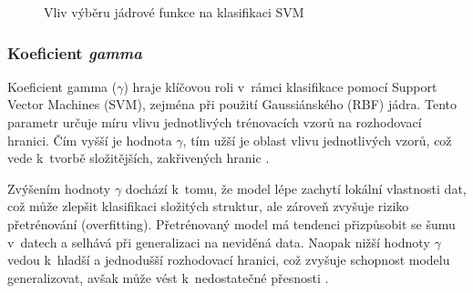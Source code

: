 \begin{figure}[h!]
  \begin{center}
  \caption{Vliv výběru jádrové funkce na klasifikaci SVM}
  \end{center}\label{chart:svm_kernel}
\end{figure}


\subsubsection{Koeficient \textit{gamma}}

Koeficient gamma (\(\gamma\)) hraje klíčovou roli v~rámci klasifikace pomocí Support Vector Machines (SVM), zejména při použití Gaussiánského (RBF) jádra. Tento parametr určuje míru vlivu jednotlivých trénovacích vzorů na rozhodovací hranici. Čím vyšší je hodnota \(\gamma\), tím užší je oblast vlivu jednotlivých vzorů, což vede k~tvorbě složitějších, zakřivených hranic \cite{kernel_types}.

Zvýšením hodnoty \(\gamma\) dochází k~tomu, že model lépe zachytí lokální vlastnosti dat, což může zlepšit klasifikaci složitých struktur, ale zároveň zvyšuje riziko přetrénování (overfitting). Přetrénovaný model má tendenci přizpůsobit se šumu v~datech a selhává při generalizaci na neviděná data. Naopak nižší hodnoty \(\gamma\) vedou k~hladší a jednodušší rozhodovací hranici, což zvyšuje schopnost modelu generalizovat, avšak může vést k~nedostatečné přesnosti \cite{bergstra2011algorithms}.

